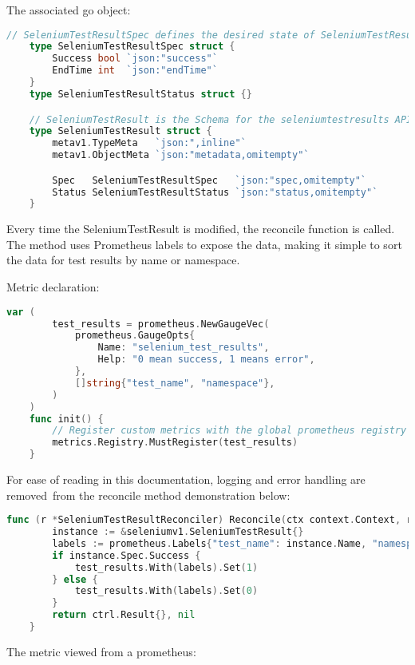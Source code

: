 The associated go object:
\begin{lstlisting}[language={Go}]
	// SeleniumTestResultSpec defines the desired state of SeleniumTestResult
	type SeleniumTestResultSpec struct {
		Success bool `json:"success"`
		EndTime int  `json:"endTime"`
	}
	type SeleniumTestResultStatus struct {}

	// SeleniumTestResult is the Schema for the seleniumtestresults API
	type SeleniumTestResult struct {
		metav1.TypeMeta   `json:",inline"`
		metav1.ObjectMeta `json:"metadata,omitempty"`

		Spec   SeleniumTestResultSpec   `json:"spec,omitempty"`
		Status SeleniumTestResultStatus `json:"status,omitempty"`
	}
\end{lstlisting}

Every time the SeleniumTestResult is modified, the reconcile function is called. The method uses Prometheus labels to expose the data, making it simple to sort the data for test results by name or namespace.

Metric declaration:

\begin{lstlisting}[language={Go}]
	var (
		test_results = prometheus.NewGaugeVec(
			prometheus.GaugeOpts{
				Name: "selenium_test_results",
				Help: "0 mean success, 1 means error",
			},
			[]string{"test_name", "namespace"},
		)
	)
	func init() {
		// Register custom metrics with the global prometheus registry
		metrics.Registry.MustRegister(test_results)
	}
\end{lstlisting}

For ease of reading in this documentation, logging and error handling are removed from the reconcile method demonstration below:

\begin{lstlisting}[language={Go}]
	func (r *SeleniumTestResultReconciler) Reconcile(ctx context.Context, req ctrl.Request) (ctrl.Result, error) {
		instance := &seleniumv1.SeleniumTestResult{}
		labels := prometheus.Labels{"test_name": instance.Name, "namespace": instance.Namespace}
		if instance.Spec.Success {
			test_results.With(labels).Set(1)
		} else {
			test_results.With(labels).Set(0)
		}
		return ctrl.Result{}, nil
	}
\end{lstlisting}

The metric viewed from a prometheus:

